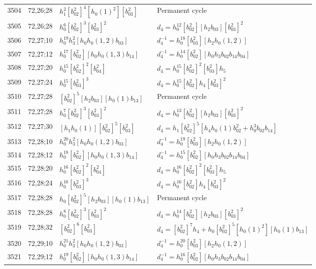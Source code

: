 \documentclass{article}
\begin{document}
\begin{longtable}{|l|l|>{\raggedright\arraybackslash}p{6cm}|>{\raggedright\arraybackslash}p{6cm}|}
\hline
3504 & 72,26;28 & $h_1^2[b_{02}^2]^4[h_0(1)^2][b_{03}^2]$ & Permanent cycle\\
3505 & 72,26;28 & $h_0^6[b_{02}^2]^3[b_{03}^2]^2$ &$d_{4}=h_0^{12}[b_{02}^2][h_2b_{03}][b_{03}^2]^2$\\
\hline
3506 & 72,27;10 & $h_0^{19}h_3^2[h_0h_0(1, 2)b_{03}]$ & $d_{4}^{-1}=h_0^{18}[b_{03}^2][h_2h_0(1, 2)]$\\
\hline
3507 & 72,27;12 & $h_0^{17}[b_{02}^2][h_0h_0(1, 3)b_{14}]$ & $d_{4}^{-1}=h_0^{14}[b_{02}^2][h_0h_3b_{02}b_{14}b_{04}]$\\
\hline
3508 & 72,27;20 & $h_0^{15}[b_{02}^2]^2[b_{04}^2]$ &$d_{4}=h_0^{15}[b_{02}^2]^2[b_{03}^2]h_5$\\
\hline
3509 & 72,27;24 & $h_0^{15}[b_{03}^2]^3$ &$d_{4}=h_0^{15}[b_{02}^2]h_4[b_{03}^2]^2$\\
\hline
3510 & 72,27;28 & $[b_{02}^2]^5[h_2b_{03}][h_0(1)b_{13}]$ & Permanent cycle\\
3511 & 72,27;28 & $h_0^7[b_{02}^2]^3[b_{03}^2]^2$ &$d_{4}=h_0^{13}[b_{02}^2][h_2b_{03}][b_{03}^2]^2$\\
\hline
3512 & 72,27;30 & $[h_1h_0(1)][b_{02}^2]^5[b_{03}^2]$ &$d_{4}=h_1[b_{02}^2]^5[h_4h_0(1)b_{02}^2 + h_0^3b_{02}b_{14}]$\\
\hline
3513 & 72,28;10 & $h_0^{20}h_3^2[h_0h_0(1, 2)b_{03}]$ & $d_{4}^{-1}=h_0^{19}[b_{03}^2][h_2h_0(1, 2)]$\\
\hline
3514 & 72,28;12 & $h_0^{18}[b_{02}^2][h_0h_0(1, 3)b_{14}]$ & $d_{4}^{-1}=h_0^{15}[b_{02}^2][h_0h_3b_{02}b_{14}b_{04}]$\\
\hline
3515 & 72,28;20 & $h_0^{16}[b_{02}^2]^2[b_{04}^2]$ &$d_{4}=h_0^{16}[b_{02}^2]^2[b_{03}^2]h_5$\\
\hline
3516 & 72,28;24 & $h_0^{16}[b_{03}^2]^3$ &$d_{4}=h_0^{16}[b_{02}^2]h_4[b_{03}^2]^2$\\
\hline
3517 & 72,28;28 & $h_0[b_{02}^2]^5[h_2b_{03}][h_0(1)b_{13}]$ & Permanent cycle\\
3518 & 72,28;28 & $h_0^8[b_{02}^2]^3[b_{03}^2]^2$ &$d_{4}=h_0^{14}[b_{02}^2][h_2b_{03}][b_{03}^2]^2$\\
\hline
3519 & 72,28;32 & $[b_{02}^2]^6[b_{03}^2]$ &$d_{4}=[b_{02}^2]^7h_4 + h_0[b_{02}^2]^5[h_0(1)^2][h_0(1)b_{13}]$\\
\hline
3520 & 72,29;10 & $h_0^{21}h_3^2[h_0h_0(1, 2)b_{03}]$ & $d_{4}^{-1}=h_0^{20}[b_{03}^2][h_2h_0(1, 2)]$\\
\hline
3521 & 72,29;12 & $h_0^{19}[b_{02}^2][h_0h_0(1, 3)b_{14}]$ & $d_{4}^{-1}=h_0^{16}[b_{02}^2][h_0h_3b_{02}b_{14}b_{04}]$\\

\end{longtable}
\end{document}
